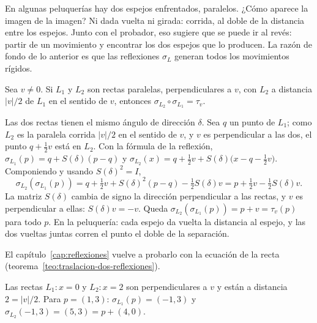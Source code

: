En algunas peluquerías hay dos espejos enfrentados, paralelos. ¿Cómo aparece la imagen de la
imagen? Ni dada vuelta ni girada: corrida, al doble de la distancia entre los espejos. Junto
con el probador, eso sugiere que se puede ir al revés: partir de un movimiento y encontrar los
dos espejos que lo producen.
La razón de fondo de lo anterior es que las reflexiones \(\sigma_L\) generan todos los
movimientos rígidos.

\begin{teorema}\label{teo:traslacion-dos-reflexiones-enunciado}
Sea \(v\neq0\). Si \(L_1\) y \(L_2\) son rectas paralelas, perpendiculares a \(v\), con \(L_2\)
a distancia \(|v|/2\) de \(L_1\) en el sentido de \(v\), entonces
\(\sigma_{L_2}\circ\sigma_{L_1}=\tau_v\).
\end{teorema}

\begin{demostracion}
Las dos rectas tienen el mismo ángulo de dirección \(\delta\). Sea \(q\) un punto de \(L_1\);
como \(L_2\) es la paralela corrida \(|v|/2\) en el sentido de \(v\), y \(v\) es perpendicular
a las dos, el punto \(q+\tfrac12v\) está en \(L_2\). Con la fórmula de la reflexión,
\(\sigma_{L_1}(p)=q+S(\delta)(p-q)\) y \(\sigma_{L_2}(x)=q+\tfrac12v+S(\delta)\bigl(x-q-\tfrac12v\bigr)\).
Componiendo y usando \(S(\delta)^2=I\),
\[
\sigma_{L_2}(\sigma_{L_1}(p))=q+\tfrac12v+S(\delta)^2(p-q)-\tfrac12S(\delta)v
=p+\tfrac12v-\tfrac12S(\delta)v .
\]
La matriz \(S(\delta)\) cambia de signo la dirección perpendicular a las rectas, y \(v\) es
perpendicular a ellas: \(S(\delta)v=-v\). Queda \(\sigma_{L_2}(\sigma_{L_1}(p))=p+v=\tau_v(p)\)
para todo \(p\). En la peluquería: cada espejo da vuelta la distancia al espejo, y las dos
vueltas juntas corren el punto el doble de la separación.
\end{demostracion}

El capítulo~\ref{cap:reflexiones} vuelve a probarlo con la ecuación de la recta
(teorema~\ref{teo:traslacion-dos-reflexiones}).

\begin{ejemplo}[\(v=(4,0)\) con las rectas \(x=0\) y \(x=2\)]\label{ej:t3}
Las rectas \(L_1\colon x=0\) y \(L_2\colon x=2\) son perpendiculares a \(v\) y están a distancia
\(2=|v|/2\). Para \(p=(1,3)\): \(\sigma_{L_1}(p)=(-1,3)\) y \(\sigma_{L_2}(-1,3)=(5,3)=p+(4,0)\).
\end{ejemplo}

